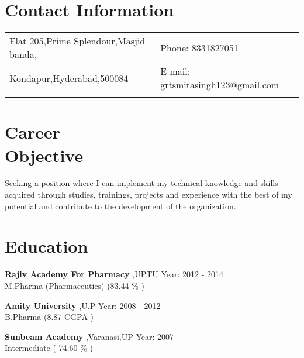 \documentclass[margin,line]{res}
\begin{document}


\begin{resume}
\section{\sc Contact Information}

\vspace{.05in}
\begin{tabular}{@{}p{3.5in}p{3in}}
Flat 205,Prime Splendour,Masjid banda,                & {Phone:}  8331827051 \\
Kondapur,Hyderabad,500084                               & {E-mail:}  grtsmitasingh123@gmail.com\\
\\
\end{tabular}


\section{\sc Career \\Objective}
Seeking a position where I can implement my technical knowledge and skills acquired through studies, trainings, projects and experience with the best of my potential and contribute to the development of the organization.\\




\section{\sc Education}

{\bf Rajiv Academy For Pharmacy} ,UPTU \hfill Year: 2012 - 2014\\
M.Pharma (Pharmaceutics) \hfill(83.44 \% )

{\bf Amity University} ,U.P \hfill Year: 2008 - 2012\\
B.Pharma \hfill(8.87 CGPA )

{\bf Sunbeam Academy },Varanasi,UP \hfill Year: 2007 \\
Intermediate \hfill( 74.60 \% )


\end{resume}
\end{document}
